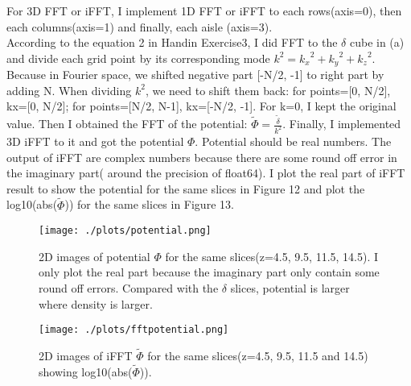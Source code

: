 For 3D FFT or iFFT, I implement 1D FFT or iFFT to each rows(axis=0), then each columns(axis=1) and finally, each aisle (axis=3). \\
According to the equation 2 in Handin Exercise3, I did FFT to the $\delta$ cube in (a) and divide each grid point by its corresponding mode $k^2={k_x}^2+{k_y}^2+{k_z}^2$. Because in Fourier space, we shifted negative part [-N/2, -1] to right part by adding N. When dividing $k^2$, we need to shift them back: for points=[0, N/2], kx=[0, N/2]; for points=[N/2, N-1], kx=[-N/2, -1]. For k=0, I kept the original value. Then I obtained the FFT of the potential: $\tilde{\Phi}=\frac{\tilde{\delta}}{k^2}$. Finally, I implemented 3D iFFT to it and got the potential $\Phi$. Potential should be real numbers. The output of iFFT are complex numbers because there are some round off error in the imaginary part( around the precision of float64). I plot the real part of iFFT result to show the potential for the same slices in Figure 12 and plot the log10(abs($\tilde{\Phi}$)) for the same slices in Figure 13.


\begin{figure}[h!]
  \centering
  \texttt{[image: ./plots/potential.png]}
  \caption{2D images of potential $\Phi$ for the same slices(z=4.5, 9.5, 11.5, 14.5). I only plot the real part because the imaginary part only contain some round off errors. Compared with the $\delta$ slices, potential is larger where density is larger. }
  \label{fig12}
\end{figure}

\begin{figure}[h!]
  \centering
  \texttt{[image: ./plots/fftpotential.png]}
  \caption{2D images of iFFT $\tilde{\Phi}$ for the same slices(z=4.5, 9.5, 11.5 and 14.5) showing log10(abs($\tilde{\Phi}$)).}
  \label{fig13}
\end{figure}
